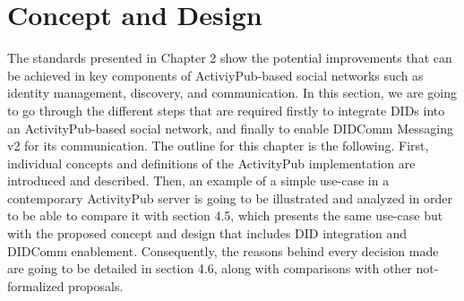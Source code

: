 \chapter{Concept and Design}
\label{cha:conceptanddesign}
 
The standards presented in Chapter 2 show the potential improvements that can be achieved in key components of ActiviyPub-based social networks such as identity management, discovery, and communication. In this section, we are going to go through the different steps that are required firstly to integrate DIDs into an ActivityPub-based social network, and finally to enable DIDComm Messaging v2 for its communication. 
The outline for this chapter is the following. First, individual concepts and definitions of the ActivityPub implementation are introduced and described. Then, an example of a simple use-case in a contemporary ActivityPub server is going to be illustrated and analyzed in order to be able to compare it with section 4.5, which presents the same use-case but with the proposed concept and design that includes DID integration and DIDComm enablement. Consequently, the reasons behind every decision made are going to be detailed in section 4.6, along with comparisons with other not-formalized proposals. 
 
 
 
 
 
 
 
